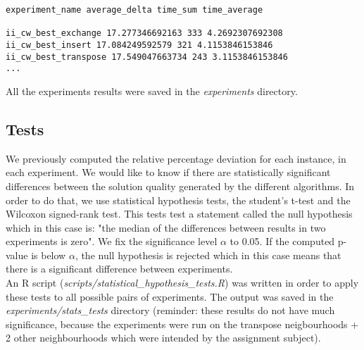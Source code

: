 \begin{lstlisting}
experiment_name average_delta time_sum time_average

ii_cw_best_exchange 17.277346692163 333 4.2692307692308
ii_cw_best_insert 17.084249592579 321 4.1153846153846
ii_cw_best_transpose 17.549047663734 243 3.1153846153846
...
\end{lstlisting}

\begin{framehint}
    All the experiments results were saved in the \emph{experiments} directory.
\end{framehint}

\newpage

\subsection{Tests}
We previously computed the relative percentage deviation for each instance, in
each experiment. We would like to know if there are statistically significant
differences between the solution quality generated by the different algorithms.
In order to do that, we use statistical hypothesis tests, the student's t-test
and the Wilcoxon signed-rank test. This tests test a statement called the
null hypothesis which in this case is: "the median of the differences between
results in two experiments is zero". We fix the significance level $\alpha$ to
0.05. If the computed p-value is below $\alpha$, the null hypothesis is rejected
which in this case means that there is a significant difference between
experiments.\\

An R script (\emph{scripts/statistical\_hypothesis\_tests.R}) was written in order
to apply these tests to all possible pairs of experiments. The output was saved
in the \emph{experiments/stats\_tests} directory (reminder: these
results do not have much significance, because the experiments were run on
the transpose neigbourhoods + 2 other neighbourhoods which were intended by the
assignment subject).\\

